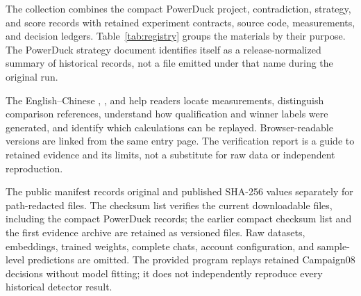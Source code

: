 \documentclass[manuscript,screen,nonacm]{acmart}
\begin{document}
The collection combines the compact PowerDuck project, contradiction, strategy,
and score records with retained experiment contracts, source code, measurements,
and decision ledgers. Table~\ref{tab:registry} groups the materials by their
purpose. The PowerDuck strategy document identifies itself as a release-normalized
summary of historical records, not a file emitted under that name during the
original run.

The English--Chinese , , and
 help readers locate measurements, distinguish comparison
references, understand how qualification and winner labels were generated, and
identify which calculations can be replayed. Browser-readable versions are
linked from the same entry page. The verification report is a guide to retained
evidence and its limits, not a substitute for raw data or independent reproduction.

The public manifest records original and published SHA-256 values separately
for path-redacted files. The checksum list verifies the current downloadable
files, including the compact PowerDuck records; the earlier compact checksum
list and the first evidence archive are retained as versioned files.
Raw datasets, embeddings, trained weights, complete chats, account configuration,
and sample-level predictions are omitted. The provided program replays retained
Campaign08 decisions without model fitting; it does not independently reproduce
every historical detector result.
\end{document}
